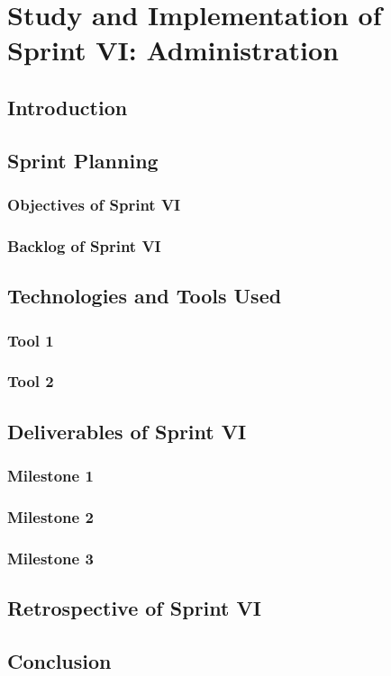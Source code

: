 \documentclass[a4paper,12pt]{report}
\begin{document}
\chapter[Sprint VI]{Study and Implementation of Sprint VI: Administration}

\minitoc
\section{Introduction}
\section{Sprint Planning}
\subsection{Objectives of Sprint VI}
\subsection{Backlog of Sprint VI}
\section{Technologies and Tools Used}
\subsection{Tool 1}
\subsection{Tool 2}
\section{Deliverables of Sprint VI}
\subsection{Milestone 1}
\subsection{Milestone 2}
\subsection{Milestone 3}
\section{Retrospective of Sprint VI}
\section{Conclusion}
\end{document}
